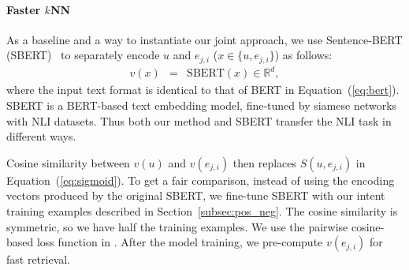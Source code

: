 \paragraph{Faster $k$NN}
As a baseline and a way to instantiate our joint approach, we use Sentence-BERT (SBERT)~\citep{sbert} to separately encode $u$ and $e_{j, i}$ ($x\in\{u, e_{j, i}\}$) as follows:
\begin{eqnarray}
    \label{eq:sbert}
    v(x) &=& \mathrm{SBERT}(x) \in\mathbb{R}^{d},
\end{eqnarray}
where the input text format is identical to that of BERT in Equation~(\ref{eq:bert}).
SBERT is a BERT-based text embedding model, fine-tuned by siamese networks with NLI datasets.
Thus both our method and SBERT transfer the NLI task in different ways.

Cosine similarity between $v(u)$ and $v(e_{j, i})$ then replaces $S(u, e_{j, i})$ in Equation~(\ref{eq:sigmoid}).
To get a fair comparison, instead of using the encoding vectors produced by the original SBERT, we fine-tune SBERT with our intent training examples described in Section~\ref{subsec:pos_neg}.
The cosine similarity is symmetric, so we have half the training examples.
We use the pairwise cosine-based loss function in \citet{sbert}.
After the model training, we pre-compute $v(e_{j, i})$ for fast retrieval.




